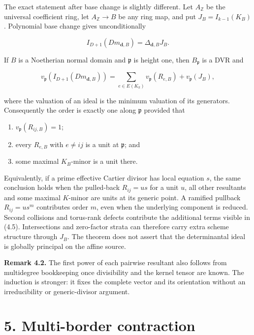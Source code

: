 \documentclass[
  11pt,
  a4paper,
]{article}
\providecommand{\tightlist}{%
  \setlength{\itemsep}{0pt}\setlength{\parskip}{0pt}}
\begin{document}
The exact statement after base change is slightly different. Let
\(A_{\mathbb Z}\) be the universal coefficient ring, let
\(A_{\mathbb Z}\to B\) be any ring map, and put \(J_B=I_{k-1}(K_B)\).
Polynomial base change gives unconditionally

\[
 I_{D+1}(Dm_{\mathbf d,B})=\Delta_{\mathbf d,B}J_B.
\tag{4.4}
\]

If \(B\) is a Noetherian normal domain and \(\mathfrak p\) is height
one, then \(B_{\mathfrak p}\) is a DVR and

\[
 v_{\mathfrak p}\!\left(I_{D+1}(Dm_{\mathbf d,B})\right)
 =\sum_{e\in E(K_k)}v_{\mathfrak p}(R_{e,B})
  +v_{\mathfrak p}(J_B),
\tag{4.5}
\]

where the valuation of an ideal is the minimum valuation of its
generators. Consequently the order is exactly one along \(\mathfrak p\)
provided that

\begin{enumerate}
\def\labelenumi{\arabic{enumi}.}
\tightlist
\item
  \(v_{\mathfrak p}(R_{ij,B})=1\);
\item
  every \(R_{e,B}\) with \(e\ne ij\) is a unit at \(\mathfrak p\); and
\item
  some maximal \(K_B\)-minor is a unit there.
\end{enumerate}

Equivalently, if a prime effective Cartier divisor has local equation
\(s\), the same conclusion holds when the pulled-back \(R_{ij}=us\) for
a unit \(u\), all other resultants and some maximal \(K\)-minor are
units at its generic point. A ramified pullback \(R_{ij}=us^m\)
contributes order \(m\), even when the underlying component is reduced.
Second collisions and torus-rank defects contribute the additional terms
visible in (4.5). Intersections and zero-factor strata can therefore
carry extra scheme structure through \(J_B\). The theorem does not
assert that the determinantal ideal is globally principal on the affine
source.

\textbf{Remark 4.2.} The first power of each pairwise resultant also
follows from multidegree bookkeeping once divisibility and the kernel
tensor are known. The induction is stronger: it fixes the complete
vector and its orientation without an irreducibility or generic-divisor
argument.

\section{5. Multi-border contraction}\label{multi-border-contraction}
\end{document}
